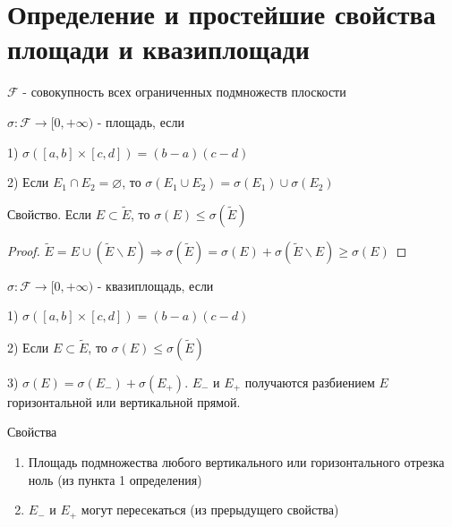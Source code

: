 \section{Определение и простейшие свойства площади и квазиплощади}

$\mathcal{F}$ - совокупность всех ограниченных подмножеств плоскости

\begin{conj}
    $\sigma: \mathcal{F} \to [0, +\infty)$ - площадь, если

    1) $\sigma([a, b]\times[c, d]) = (b-a)(c-d)$

    2) Если $E_1\cap E_2 = \varnothing$, то $\sigma(E_1 \cup E_2) = \sigma(E_1) \cup \sigma(E_2)$
\end{conj}

Свойство. Если $E \subset \widetilde{E}$, то
$\sigma(E) \leq \sigma(\widetilde{E})$

\begin{proof}
    $\widetilde{E} = E \cup (\widetilde{E} \backslash E) \Rightarrow
    \sigma(\widetilde{E}) = \sigma(E) + \sigma(\widetilde{E} \backslash E) \geq \sigma(E)$
\end{proof}

\begin{conj}
    $\sigma: \mathcal{F} \to [0, +\infty)$ - квазиплощадь, если

    1) $\sigma([a, b]\times[c, d]) = (b-a)(c-d)$

    2) Если $E \subset \widetilde{E}$, то $\sigma(E) \leq \sigma(\widetilde{E})$

    3) $\sigma(E) = \sigma(E_{-}) + \sigma(E_{+})$. $E_{-}$ и $E_{+}$ получаются
    разбиением $E$ горизонтальной или вертикальной прямой.
\end{conj}

Свойства
\begin{enumerate}
    \item Площадь подмножества любого вертикального или горизонтального отрезка ноль (из пункта 1 определения)
    \item $E_{-}$ и $E_{+}$ могут пересекаться (из прерыдущего свойства)
\end{enumerate}